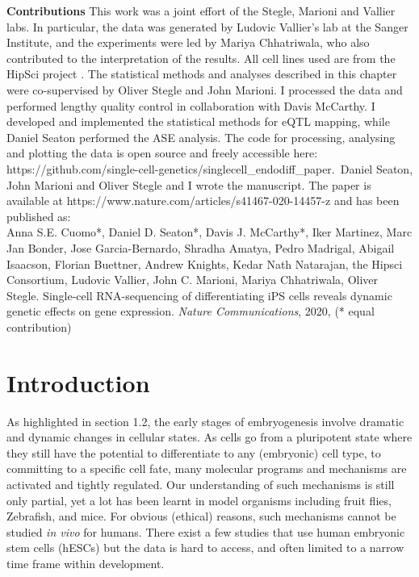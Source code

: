 \begin{Abstract}
\hspace{-3mm}\textbf{Contributions} This work was a joint effort of the Stegle, Marioni and Vallier labs. 
In particular, the data was generated by Ludovic Vallier’s lab at the Sanger Institute, and the experiments were led by Mariya Chhatriwala, who also contributed to the interpretation of the results. 
All cell lines used are from the HipSci project \cite{}.
The statistical methods and analyses described in this chapter were co-supervised by Oliver Stegle and John Marioni. 
I processed the data and performed lengthy quality control in collaboration with Davis McCarthy. 
I developed and implemented the statistical methods for eQTL mapping, while
Daniel Seaton performed the ASE analysis.
The code for processing, analysing and plotting the data is open source and freely accessible here: https://github.com/single-cell-genetics/singlecell\_endodiff\_paper.\
Daniel Seaton, John Marioni and Oliver Stegle and I wrote the manuscript. 
The paper \cite{cuomo2020single} is available at https://www.nature.com/articles/s41467-020-14457-z and has been published as:\\

Anna S.E. Cuomo*, Daniel D. Seaton*, Davis J. McCarthy*, Iker Martinez, Marc Jan Bonder, Jose Garcia-Bernardo, Shradha Amatya, Pedro Madrigal, Abigail Isaacson, Florian Buettner, Andrew Knights, Kedar Nath Natarajan, the Hipsci Consortium, Ludovic Vallier, John C. Marioni, Mariya Chhatriwala, Oliver Stegle. Single-cell RNA-sequencing of differentiating iPS cells reveals dynamic genetic effects on gene expression. \textit{Nature Communications}, 2020, (* equal contribution)

\vfill
\end{Abstract}

\section{Introduction}

As highlighted in section 1.2, the early stages of embryogenesis involve dramatic and dynamic changes in cellular states. 
As cells go from a pluripotent state where they still have the potential to differentiate to any (embryonic) cell type, to committing to a specific cell fate, many molecular programs and mechanisms are activated and tightly regulated.
Our understanding of such mechanisms is still only partial, yet a lot has been learnt in model organisms including fruit flies, Zebrafish, and mice. 
For obvious (ethical) reasons, such mechanisms cannot be studied \textit{in vivo} for humans. 
There exist a few studies that use human embryonic stem cells (hESCs) but the data is hard to access, and often limited to a narrow time frame within development. \\

